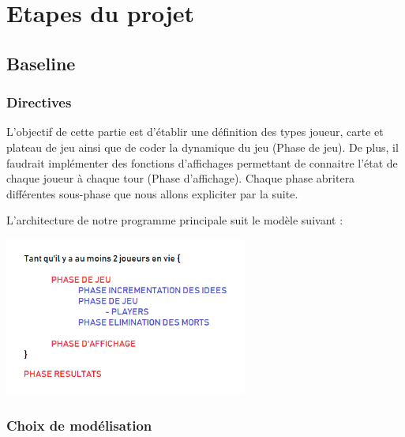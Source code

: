 \documentclass[a4paper]{article}
\begin{document}
\section{Etapes du projet}
\subsection{Baseline}
\subsubsection{Directives}

L'objectif de cette partie est d'établir une définition des types joueur, carte et plateau de jeu ainsi que de coder la dynamique du jeu (Phase de jeu). De plus, il faudrait implémenter des fonctions d'affichages permettant de connaitre l'état de chaque joueur à chaque tour (Phase d'affichage).
Chaque phase abritera différentes sous-phase que nous allons expliciter par la suite.

L'architecture de notre programme principale suit le modèle suivant :
\begin{center}
\includegraphics[width=0.6\textwidth]{Baseline}\\[1cm]
\end{center}
\subsubsection{Choix de modélisation}
\end{document}
